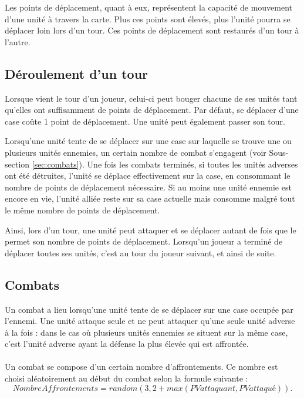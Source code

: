 	Les points de déplacement, quant à eux, représentent la capacité de mouvement d'une unité à travers la carte. Plus ces points sont élevés, plus l'unité pourra se déplacer loin lors d'un tour. Ces points de déplacement sont restaurés d'un tour à l'autre.
	
	\subsection{Déroulement d'un tour}
	Lorsque vient le tour d'un joueur, celui-ci peut bouger chacune de ses unités tant qu'elles ont suffisamment de points de déplacement. Par défaut, se déplacer d'une case coûte 1 point de déplacement. Une unité peut également passer son tour.
	
	Lorsqu'une unité tente de se déplacer sur une case sur laquelle se trouve une ou plusieurs unités ennemies, un certain nombre de combat s'engagent (voir Sous-section \ref{sec:combats}). Une fois les combats terminés, si toutes les unités adverses ont été détruites, l'unité se déplace effectivement sur la case, en consommant le nombre de points de déplacement nécessaire. Si au moins une unité ennemie est encore en vie, l'unité alliée reste sur sa case actuelle mais consomme malgré tout le même nombre de points de déplacement.
	
	Ainsi, lors d'un tour, une unité peut attaquer et se déplacer autant de fois que le permet son nombre de points de déplacement. Lorsqu'un joueur a terminé de déplacer toutes ses unités, c'est au tour du joueur suivant, et ainsi de suite.

	\subsection{Combats}
	\label{subsec:combats}
	Un combat a lieu lorsqu'une unité tente de se déplacer sur une case occupée par l'ennemi. Une unité attaque seule et ne peut attaquer qu'une seule unité adverse à la fois : dans le cas où plusieurs unités ennemies se situent sur la même case, c'est l'unité adverse ayant la défense la plus élevée qui est affrontée.
	
	\paragraph{}
	Un combat se compose d’un certain nombre d’affrontements. Ce nombre est choisi aléatoirement au début du combat selon la formule suivante : \[ NombreAffrontements = random(3,2+max(PVattaquant, PVattaqué)). \]
	

